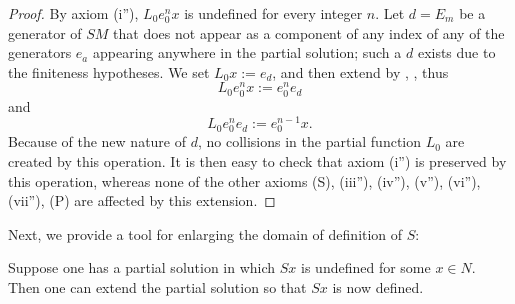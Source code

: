 \begin{proof}  By axiom (i''), $L_0 e_0^n x$ is undefined for every integer $n$.  Let $d = E_m$ be a generator of $SM$ that does not appear as a component of any index of any of the generators $e_a$ appearing anywhere in the partial solution; such a $d$ exists due to the finiteness hypotheses.  We set $L_0 x := e_d$, and then extend by , , thus
$$L_0 e_0^n x := e_0^n e_d$$
and
$$L_0 e_0^n e_d := e_0^{n-1} x.$$
Because of the new nature of $d$, no collisions in the partial function $L_0$ are created by this operation.  It is then easy to check that axiom (i'') is preserved by this operation, whereas none of the other axioms (S), (iii''), (iv''), (v''), (vi''), (vii''), (P) are affected by this extension.
\end{proof}

Next, we provide a tool for enlarging the domain of definition of $S$:

\begin{proposition}[Enlarging $S$]\label{enlarge-S}  Suppose one has a partial solution in which $Sx$ is undefined for some $x \in N$.  Then one can extend the partial solution so that $Sx$ is now defined.
\end{proposition}

